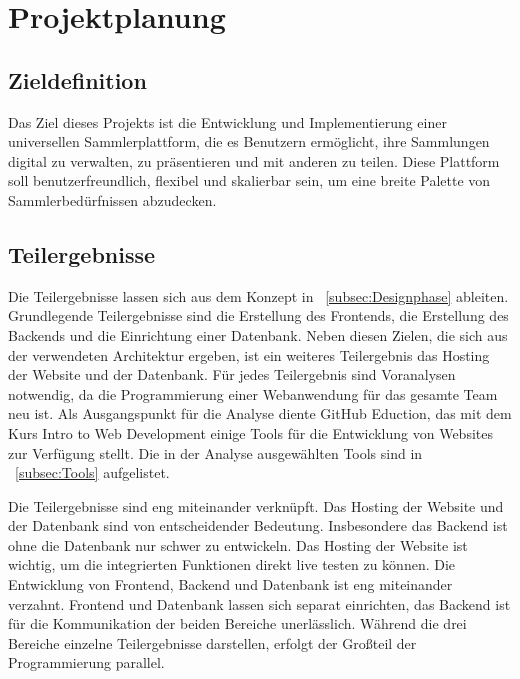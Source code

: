 \section{Projektplanung}\label{sec:projektplanung}

\subsection{Zieldefinition}\label{subsec:zieldefinition}
Das Ziel dieses Projekts ist die Entwicklung und Implementierung einer universellen Sammlerplattform, die es Benutzern ermöglicht, ihre Sammlungen digital zu verwalten, zu präsentieren und mit anderen zu teilen.
Diese Plattform soll benutzerfreundlich, flexibel und skalierbar sein, um eine breite Palette von Sammlerbedürfnissen abzudecken.

\subsection{Teilergebnisse}\label{subsec:teilergebnisses}
Die Teilergebnisse lassen sich aus dem Konzept in ~\ref{subsec:Designphase} ableiten.
Grundlegende Teilergebnisse sind die Erstellung des Frontends, die Erstellung des Backends und die Einrichtung einer Datenbank.
Neben diesen Zielen, die sich aus der verwendeten Architektur ergeben, ist ein weiteres Teilergebnis das Hosting der Website und der Datenbank.
Für jedes Teilergebnis sind Voranalysen notwendig, da die Programmierung einer Webanwendung für das gesamte Team neu ist.
Als Ausgangspunkt für die Analyse diente GitHub Eduction, das mit dem Kurs Intro to Web Development einige Tools für die Entwicklung von Websites zur Verfügung stellt.
Die in der Analyse ausgewählten Tools sind in ~\ref{subsec:Tools} aufgelistet.

Die Teilergebnisse sind eng miteinander verknüpft.
Das Hosting der Website und der Datenbank sind von entscheidender Bedeutung.
Insbesondere das Backend ist ohne die Datenbank nur schwer zu entwickeln.
Das Hosting der Website ist wichtig, um die integrierten Funktionen direkt live testen zu können.
Die Entwicklung von Frontend, Backend und Datenbank ist eng miteinander verzahnt.
Frontend und Datenbank lassen sich separat einrichten, das Backend ist für die Kommunikation der beiden Bereiche unerlässlich.
Während die drei Bereiche einzelne Teilergebnisse darstellen, erfolgt der Großteil der Programmierung parallel.

